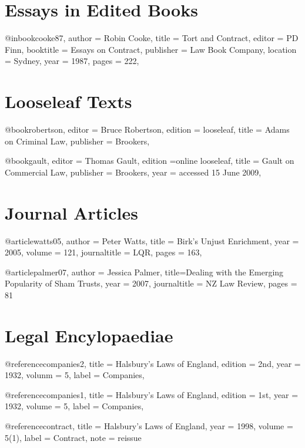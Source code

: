 \documentclass{book}
\begin{document}
\section{Essays in Edited Books}
\begin{bib}
@inbook{cooke87,
author = {Robin Cooke},
title = {Tort and Contract},
editor = {PD Finn},
booktitle = {Essays on Contract},
publisher = {Law Book Company},
location = {Sydney},
year = {1987},
pages = {222},
}
\end{bib}

\section{Looseleaf Texts}
\begin{bib}
@book{robertson,
editor = {Bruce Robertson},
edition = {looseleaf},
title = {Adams on Criminal Law},
publisher = {Brookers},
}
\end{bib}
\begin{bib}
@book{gault,
editor = {Thomas Gault},
edition ={online looseleaf},
title = {Gault on Commercial Law},
publisher = {Brookers},
year = {accessed 15 June 2009},
}
\end{bib}

\section{Journal Articles}
\begin{bib}
@article{watts05,
author = {Peter Watts},
title = {Birk's Unjust Enrichment},
year = {2005},
volume = {121},
journaltitle = {LQR},
pages = {163},
}
\end{bib}
\begin{bib}
@article{palmer07,
author = {Jessica Palmer},
title={Dealing with the Emerging Popularity of Sham Trusts},
year = {2007},
journaltitle = {NZ Law Review},
pages = {81}
}
\end{bib}

\section{Legal Encylopaediae}
\begin{bib}
@reference{companies2,
title = {Halsbury's Laws of England},
edition = {2nd},
year = {1932},
volunm = {5},
label = {Companies},
}
\end{bib}
\begin{bib}
@reference{companies1,
title = {Halsbury's Laws of England},
edition = {1st},
year = {1932},
volume = {5},
label = {Companies},
}
\end{bib}
\begin{bib}
@reference{contract,
title = {Halsbury's Laws of England},
year = {1998},
volume = {5(1)},
label = {Contract},
note = {reissue}
}
\end{bib}
\end{document}
